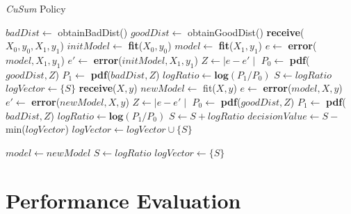 \documentclass{mpaper}
\begin{document}

\begin{algorithm}[!h]
\caption{\textit{CuSum} Policy}\label{polCusum}
\begin{algorithmic}
\State $badDist \gets$ obtainBadDist() 
\State $goodDist \gets$ obtainGoodDist() 
\State \textbf{receive}($X_0, y_0, X_1, y_1$)
\State $initModel \gets$ \textbf{fit}($X_0, y_0$)
\State $model \gets$ \textbf{fit}($X_1, y_1$)
\State $e \gets$ \textbf{error}($model,X_1,y_1$)
\State $e' \gets$ \textbf{error}($initModel,X_1,y_1$)
\State $Z \gets \mid e - e' \mid$
\State $P_0 \gets$ \textbf{pdf}($goodDist,Z$)
\State $P_1 \gets$ \textbf{pdf}($badDist,Z$)
\State $logRatio \gets \textbf{log}(P_1/P_0)$
\State $S \gets logRatio$
\State $logVector \gets \{S\}$
    \State \textbf{receive}($X, y$)
    \State $newModel \gets$ fit($X,y$)
    \State $e \gets$ \textbf{error}($model,X,y$)
    \State $e' \gets$ \textbf{error}($newModel,X,y$)
    \State $Z \gets \mid e - e' \mid$
    \State $P_0 \gets$ \textbf{pdf}($goodDist, Z$)
    \State $P_1 \gets$ \textbf{pdf}($badDist, Z$)
    \State $logRatio \gets \textbf{log}(P_1/P_0)$
    \State $S \gets S + logRatio$
    \State $decisionValue \gets S - $ min($logVector$)
    \State $logVector\gets logVector \cup \{S\}$

        \State $model \gets newModel$ 
        \State $S \gets logRatio$
        \State $logVector \gets \{S\}$
    \EndIf
\EndWhile
\end{algorithmic}
\end{algorithm}
\newpage
\section{Performance Evaluation}
\end{document}
